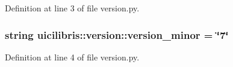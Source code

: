 \-Definition at line 3 of file version.\-py.

\hypertarget{namespaceuicilibris_1_1version_abebe26f12f2b7b3aa2ed3878c6b4848d}{
\subsubsection[{version\-\_\-minor}]{\setlength{\rightskip}{0pt plus 5cm}string {\bf uicilibris\-::version\-::version\-\_\-minor} = \char`\"{}7\char`\"{}}}\label{namespaceuicilibris_1_1version_abebe26f12f2b7b3aa2ed3878c6b4848d}


\-Definition at line 4 of file version.\-py.

